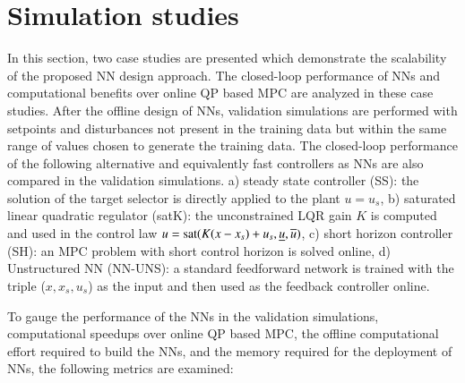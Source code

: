 \documentclass[preprint,5p, twocolumn, authoryear]{elsarticle}
\begin{document}
\section{Simulation studies} \label{sec:simulation_studies}
In this section, two case studies are presented 
which demonstrate the 
scalability of the proposed NN design approach.
The closed-loop performance of NNs and computational benefits over 
online QP based MPC are analyzed in these case studies.
After the offline design of NNs,
validation simulations are performed with 
setpoints and disturbances not present 
in the training data but within the same range 
of values chosen to generate the training data.
The closed-loop performance of the 
following alternative and 
equivalently fast controllers as NNs are also compared
in the validation simulations.
a) steady state controller (SS): the solution
of the target selector is directly applied to the plant 
$u = u_s$, b) saturated linear quadratic regulator (satK):
the unconstrained LQR gain 
$K$ is computed and used in the control law 
$u = \textnormal{sat}(K(x-x_s) + u_s, \underline{u}, \overline{u})$,
c) short horizon controller (SH): an MPC problem
with short control horizon is solved online, 
d) Unstructured NN (NN-UNS): a standard feedforward network is 
trained with the triple ($x, x_s, u_s$) as the input
and then used as the feedback controller online.

To gauge the performance of the NNs in 
the validation simulations, computational 
speedups over online QP based MPC, the offline
computational effort required to build the NNs,
and the memory required for the deployment of NNs,  
the following metrics are examined:
\end{document}
